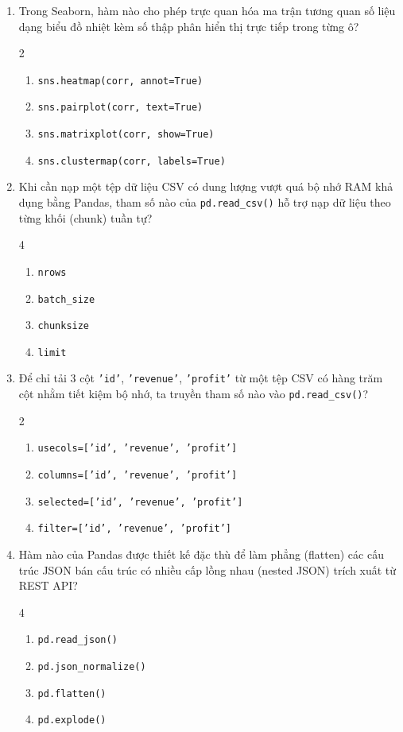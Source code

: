 \documentclass[11pt,a4paper]{article}
\begin{document}
\begin{enumerate}[leftmargin=*,itemsep=2.5pt,resume]
\item Trong Seaborn, hàm nào cho phép trực quan hóa ma trận tương quan số liệu dạng biểu đồ nhiệt kèm số thập phân hiển thị trực tiếp trong từng ô?
\begin{multicols}{2}
\begin{enumerate}[label=\Alph*.]
  \item \texttt{sns.heatmap(corr, annot=True)}
  \item \texttt{sns.pairplot(corr, text=True)}
  \item \texttt{sns.matrixplot(corr, show=True)}
  \item \texttt{sns.clustermap(corr, labels=True)}
\end{enumerate}
\end{multicols}

\item Khi cần nạp một tệp dữ liệu CSV có dung lượng vượt quá bộ nhớ RAM khả dụng bằng Pandas, tham số nào của \texttt{pd.read\_csv()} hỗ trợ nạp dữ liệu theo từng khối (chunk) tuần tự?
\begin{multicols}{4}
\begin{enumerate}[label=\Alph*.]
  \item \texttt{nrows}
  \item \texttt{batch\_size}
  \item \texttt{chunksize}
  \item \texttt{limit}
\end{enumerate}
\end{multicols}

\item Để chỉ tải 3 cột \texttt{'id'}, \texttt{'revenue'}, \texttt{'profit'} từ một tệp CSV có hàng trăm cột nhằm tiết kiệm bộ nhớ, ta truyền tham số nào vào \texttt{pd.read\_csv()}?
\begin{multicols}{2}
\begin{enumerate}[label=\Alph*.]
  \item \texttt{usecols=['id', 'revenue', 'profit']}
  \item \texttt{columns=['id', 'revenue', 'profit']}
  \item \texttt{selected=['id', 'revenue', 'profit']}
  \item \texttt{filter=['id', 'revenue', 'profit']}
\end{enumerate}
\end{multicols}

\item Hàm nào của Pandas được thiết kế đặc thù để làm phẳng (flatten) các cấu trúc JSON bán cấu trúc có nhiều cấp lồng nhau (nested JSON) trích xuất từ REST API?
\begin{multicols}{4}
\begin{enumerate}[label=\Alph*.]
  \item \texttt{pd.read\_json()}
  \item \texttt{pd.json\_normalize()}
  \item \texttt{pd.flatten()}
  \item \texttt{pd.explode()}
\end{enumerate}
\end{multicols}


\end{enumerate}
\end{document}
